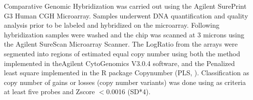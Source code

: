 
Comparative Genomic Hybridization was carried out using the Agilent SurePrint G3 Human CGH Microarray. Samples underwent DNA quantification and quality analysis prior to be labeled and hybridized on the microarray. Following hybridization samples were washed and the chip was scanned at 3 microns using the Agilent SureScan Microarray Scanner. The LogRatio from the arrays were segmented into regions of estimated equal copy number using both the method implemented in theAgilent CytoGenomics V3.0.4 software, and the Penalized least square implemented in the R package Copynumber (PLS, \cite{nilsen2012copynumber}). Classification as copy number of gains or losses (copy number variants) was done using as criteria at least five probes and Zscore $<$0.0016 (SD*4)\cite{vermeesch2005molecular}. 
 




